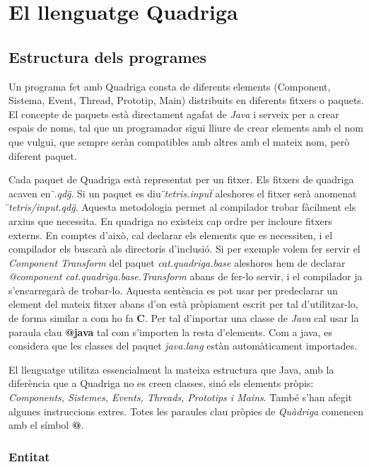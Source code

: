 \chapter{El llenguatge Quadriga}

\section{Estructura dels programes}

Un programa fet amb Quadriga consta de diferents elements (Component, Sistema, Event, Thread, Prototip, Main) distribuits en diferents fitxers o paquets. El concepte de paquets està directament agafat de {\em Java} i serveix per a crear espais de noms, tal que un programador sigui lliure de crear elements amb el nom que vulgui, que sempre seràn compatibles amb altres amb el mateix nom, però diferent paquet.

Cada paquet de Quadriga està representat per un fitxer. Els fitxers de quadriga acaven en {\em \"{}.qdg\"{}}. Si un paquet es diu {\em \"{}tetris.input\"{}} aleshores el fitxer serà anomenat {\em \"{}tetris/input.qdg\"{}}. Aquesta metodologia permet al compilador trobar fàcilment els arxius que necessita. En quadriga no existeix cap ordre per incloure fitxers externs. En comptes d'això, cal declarar els elements que es necessiten, i el compilador els buscarà als directoris d'inclusió. Si per exemple volem fer servir el {\em Component Transform} del paquet {\em cat.quadriga.base} aleshores hem de declarar {\em @component cat.quadriga.base.Transform} abans de fer-lo servir, i el compilador ja s'encarregarà de trobar-lo. Aquesta sentència es pot usar per predeclarar un element del mateix fitxer abans d'on està pròpiament escrit per tal d'utilitzar-lo, de forma similar a com ho fa {\bf C}. Per tal d'inportar una classe de {\em Java} cal usar la paraula clau {\bf @java} tal com s'importen la resta d'elements. Com a java, es considera que les classes del paquet {\em java.lang} estàn automàticament importades.

El llenguatge utilitza essencialment la mateixa estructura que Java, amb la diferència que a Quadriga no es creen classes, sinó els elements pròpis: {\em Components, Sistemes, Events, Threads, Prototips i Mains}. També s'han afegit algunes instruccions extres. Totes les paraules clau pròpies de {\em Quàdriga} comencen amb el símbol {\bf @}.

\subsection{Entitat}

